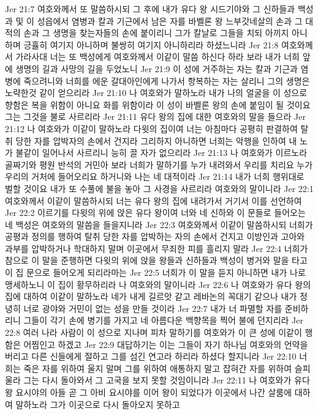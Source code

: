 Jer 21:7  여호와께서 또 말씀하시되 그 후에 내가 유다 왕 시드기야와 그 신하들과 백성과 및 이 성읍에서 염병과 칼과 기근에서 남은 자를 바벨론 왕 느부갓네살의 손과 그 대적의 손과 그 생명을 찾는자들의 손에 붙이리니 그가 칼날로 그들을 치되 아끼지 아니하며 긍휼히 여기지 아니하며 불쌍히 여기지 아니하리라 하셨느니라
Jer 21:8  여호와께서 가라사대 너는 또 백성에게 여호와께서 이같이 말씀 하신다 하라 보라 내가 너희 앞에 생명의 길과 사망의 길을 두었노니
Jer 21:9  이 성에 거주하는 자는 칼과 기근과 염병에 죽으려니와 너희를 에운 갈대아인에게 나가서 항복하는 자는 살리니 그의 생명은 노략한것 같이 얻으리라
Jer 21:10  나 여호와가 말하노라 내가 나의 얼굴을 이 성으로 향함은 복을 위함이 아니요 화를 위함이라 이 성이 바벨론 왕의 손에 붙임이 될 것이요 그는 그것을 불로 사르리라
Jer 21:11  유다 왕의 집에 대한 여호와의 말을 들으라
Jer 21:12  나 여호와가 이같이 말하노라 다윗의 집이여 너는 아침마다 공평히 판결하여 탈취 당한 자를 압박자의 손에서 건지라 그리하지 아니하면 너희는 악행을 인하여 내 노가 불같이 일어나서 사르리니 능히 끌 자가 없으리라
Jer 21:13  나 여호와가 이르노라 골짜기와 평원 반석의 거민아 보라 너희가 말하기를 누가 내려와서 우리를 치리요 누가 우리의 거처에 들어오리요 하거니와 나는 네 대적이라
Jer 21:14  내가 너희 행위대로 벌할 것이요 내가 또 수풀에 불을 놓아 그 사경을 사르리라 여호와의 말이니라
Jer 22:1  여호와께서 이같이 말씀하시되 너는 유다 왕의 집에 내려가서 거기서 이를 선언하여
Jer 22:2  이르기를 다윗의 위에 앉은 유다 왕이여 너와 네 신하와 이 문들로 들어오는 네 백성은 여호와의 말씀을 들을지니라
Jer 22:3  여호와께서 이같이 말씀하시되 너희가 공평과 정의를 행하여 탈취 당한 자를 압박하는 자의 손에서 건지고 이방인과 고아와 과부를 압박하거나 학대하지 말며 이곳에서 무죄한 피를 흘리지 말라
Jer 22:4  너희가 참으로 이 말을 준행하면 다윗의 위에 앉을 왕들과 신하들과 백성이 병거와 말을 타고 이 집 문으로 들어오게 되리라마는
Jer 22:5  너희가 이 말을 듣지 아니하면 내가 나로 맹세하노니 이 집이 황무하리라 나 여호와의 말이니라
Jer 22:6  나 여호와가 유다 왕의 집에 대하여 이같이 말하노라 네가 내게 길르앗 같고 레바논의 꼭대기 같으나 내가 정녕히 너로 광야와 거민이 없는 성을 만들 것이라
Jer 22:7  내가 너 파멸할 자를 준비하리니 그들이 각기 손에 병기를 가지고 네 아름다운 백향목을 찍어 불에 던지리라
Jer 22:8  여러 나라 사람이 이 성으로 지나며 피차 말하기를 여호와가 이 큰 성에 이같이 행함은 어찜인고 하겠고
Jer 22:9  대답하기는 이는 그들이 자기 하나님 여호와의 언약을 버리고 다른 신들에게 절하고 그를 섬긴 연고라 하리라 하셨다 할지니라
Jer 22:10  너희는 죽은 자를 위하여 울지 말며 그를 위하여 애통하지 말고 잡혀간 자를 위하여 슬피 울라 그는 다시 돌아와서 그 고국을 보지 못할 것임이니라
Jer 22:11  나 여호와가 유다왕 요시야의 아들 곧 그 아비 요시야를 이어 왕이 되었다가 이곳에서 나간 살룸에 대하여 말하노라 그가 이곳으로 다시 돌아오지 못하고
